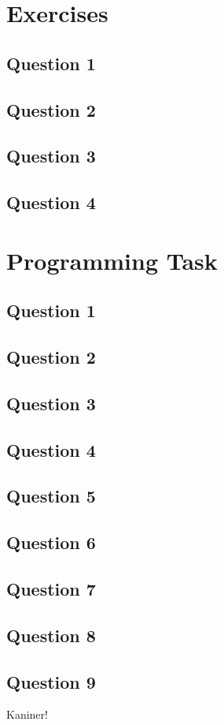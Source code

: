 \documentclass[12pt,a4paper]{article}
\begin{document}
\section*{Exercises} 
\label{sec:exercises}

\subsection*{Question 1}
\label{sec:eq1}

\subsection*{Question 2}
\label{sec:eq2}

\subsection*{Question 3}
\label{sec:eq3}

\subsection*{Question 4}
\label{sec:eq4}

\section*{Programming Task}
\label{sec:programming}

\subsection*{Question 1}
\label{sec:pq1}

\subsection*{Question 2}
\label{sec:pq2}

\subsection*{Question 3}
\label{sec:pq3}

\subsection*{Question 4}
\label{sec:pq4}

\subsection*{Question 5}
\label{sec:pq5}

\subsection*{Question 6}
\label{sec:pq6}

\subsection*{Question 7}
\label{sec:pq7} 

\subsection*{Question 8}
\label{sec:pq8}

\subsection*{Question 9}
\label{sec:pq9}
Kaniner!
\end{document}
